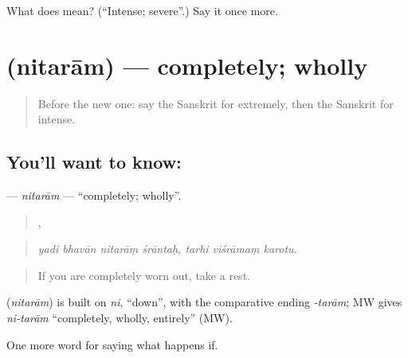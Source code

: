 \begin{tcolorbox}[breakable,colback=teal!4,colframe=teal!35!black,title={Before you move on}]
What does  mean? (\textquotedblleft{}Intense; severe\textquotedblright{}.) Say it once more.
\end{tcolorbox}
\section[\texorpdfstring{\sk{नितराम्} (nitarām)}{नितराम् (nitarām)}]{ (nitarām) — completely; wholly}

\label{lesson:SA-C377-nitaram}



\begin{quote}
Before the new one: say the Sanskrit for extremely, then the Sanskrit for intense.
\end{quote}

\subsection*{You'll want to know: }
\textbf{} — \emph{nitarām} — \textquotedblleft{}completely; wholly\textquotedblright{}.

\begin{quote}
   ,   
\end{quote}

\begin{quote}
\emph{yadi bhavān nitarāṃ śrāntaḥ, tarhi viśrāmaṃ karotu.}
\end{quote}

\begin{quote}
If you are completely worn out, take a rest.
\end{quote}

\begin{cousinweb}
\textbf{} (\emph{nitarām}) is built on \emph{ni}, \textquotedblleft{}down\textquotedblright{}, with the comparative ending \emph{-tarām}; MW gives \emph{ni-tarām} \textquotedblleft{}completely, wholly, entirely\textquotedblright{} (MW).
\end{cousinweb}

\begin{grammarlens}[title={What you've built}]
One more word for saying what happens if.
\end{grammarlens}

